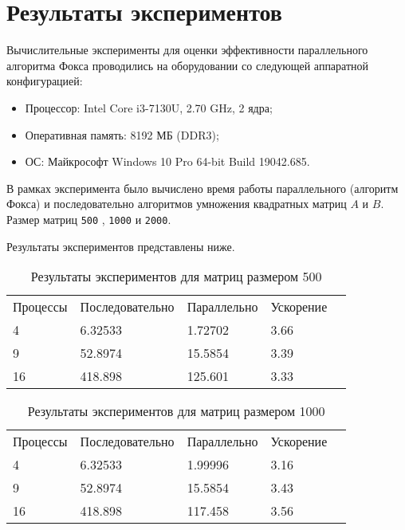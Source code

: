 \documentclass{report}
\begin{document}
\section*{Результаты экспериментов}
Вычислительные эксперименты для оценки эффективности параллельного алгоритма Фокса проводились на оборудовании со следующей аппаратной конфигурацией:

\begin{itemize}
\item Процессор: Intel Core i3-7130U, 2.70 GHz, 2 ядра;
\item Оперативная память: 8192 МБ (DDR3);
\item ОС: Майкрософт Windows 10 Pro 64-bit Build 19042.685.
\end{itemize}

\par В рамках эксперимента было вычислено время работы параллельного (алгоритм Фокса)
и последовательно алгоритмов умножения квадратных матриц {\itshape $A$} и {\itshape $B$}. Размер матриц \verb|500| , \verb|1000| и \verb|2000|.
\par Результаты экспериментов представлены ниже.

\begin{table}[!h]
\caption{Результаты экспериментов для матриц размером 500}
\centering
\begin{tabular}{lllll}
Процессы & Последовательно & Параллельно & Ускорение  \\
4        & 6.32533         & 1.72702     & 3.66       \\
9        & 52.8974         & 15.5854     & 3.39       \\
16       & 418.898         & 125.601     & 3.33       
\end{tabular}
\end{table}

\begin{table}[!h]
\caption{Результаты экспериментов для матриц размером 1000}
\centering
\begin{tabular}{lllll}
Процессы & Последовательно & Параллельно & Ускорение  \\
4        & 6.32533         & 1.99996     & 3.16       \\
9        & 52.8974         & 15.5854     & 3.43       \\
16       & 418.898         & 117.458     & 3.56       
\end{tabular}
\end{table}
\end{document}
